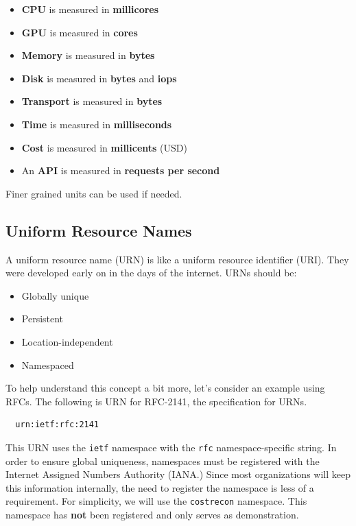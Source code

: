 \documentclass[10pt, a4paper, twocolumn]{article}
\begin{document}
    \begin{itemize}
      \item \textbf{CPU} is measured in \textbf{millicores}
      \item \textbf{GPU} is measured in \textbf{cores}
      \item \textbf{Memory} is measured in \textbf{bytes}
      \item \textbf{Disk} is measured in \textbf{bytes} and \textbf{iops}
      \item \textbf{Transport} is measured in \textbf{bytes}
      \item \textbf{Time} is measured in \textbf{milliseconds}
      \item \textbf{Cost} is measured in \textbf{millicents} (USD)
      \item An \textbf{API} is measured in \textbf{requests per second}
    \end{itemize}

    Finer grained units can be used if needed.

  \subsection*{Uniform Resource Names}
    A uniform resource name (URN) is like a uniform resource identifier (URI).
    They were developed early on in the days of the internet.
    URNs should be:

    \begin{itemize}
      \item Globally unique
      \item Persistent
      \item Location-independent
      \item Namespaced
    \end{itemize}

    To help understand this concept a bit more, let's consider an example using RFCs.
    The following is URN for RFC-2141, the specification for URNs.

\begin{verbatim}
  urn:ietf:rfc:2141
\end{verbatim}

    This URN uses the \texttt{ietf} namespace with the \texttt{rfc} namespace-specific string.
    In order to ensure global uniqueness, namespaces must be registered with the Internet Assigned Numbers Authority (IANA.)
    Since most organizations will keep this information internally, the need to register the namespace is less of a requirement.
    For simplicity, we will use the \texttt{costrecon} namespace.
    This namespace has \textbf{not} been registered and only serves as demonstration.
\end{document}
